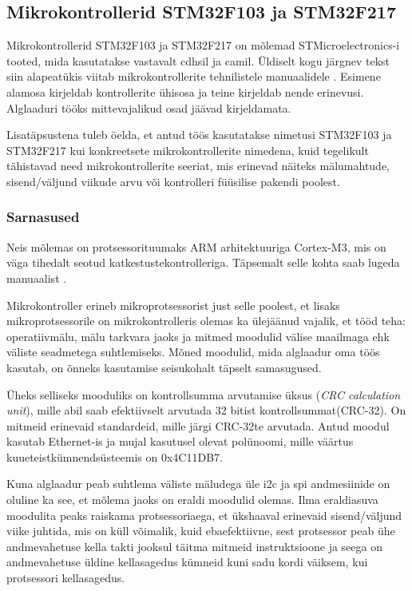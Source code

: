 \documentclass[12pt,a4paper]{article}
\begin{document}
\subsection{Mikrokontrollerid STM32F103 ja STM32F217}
\label{sec:mcu}
Mikrokontrollerid STM32F103 ja STM32F217 on mõlemad STMicroelectronics-i tooted,
mida kasutatakse vastavalt \gls{cdhs}il ja \gls{cam}il. Üldiselt kogu järgnev tekst siin
alapeatükis viitab mikrokontrollerite tehnilistele manuaalidele
\cite{f1rm,f2rm}. Esimene alamosa kirjeldab kontrollerite ühisosa ja teine
kirjeldab nende erinevusi. Alglaaduri tööks mittevajalikud osad jäävad
kirjeldamata.

Lisatäpsustena tuleb öelda, et antud töös kasutatakse nimetusi STM32F103 ja
STM32F217 kui konkreetsete mikrokontrollerite nimedena, kuid tegelikult
tähistavad need mikrokontrollerite seeriat, mis erinevad näiteks mälumahtude,
sisend/väljund viikude arvu või kontrolleri füüsilise pakendi poolest.

\subsubsection{Sarnasused}
\label{sec:mcu:same}
Neis mõlemas on protsessorituumaks ARM arhitektuuriga Cortex-M3, mis on väga
tihedalt seotud katkestustekontrolleriga. Täpsemalt selle kohta saab lugeda
manuaalist \cite{CM3pm}.

Mikrokontroller erineb mikroprotsessorist just selle poolest, et lisaks
mikroprotsessorile on mikrokontrolleris olemas ka ülejäänud vajalik, et tööd
teha: operatiivmälu, mälu tarkvara jaoks ja mitmed moodulid välise maailmaga ehk
väliste seadmetega suhtlemiseks. Mõned moodulid, mida alglaadur oma töös
kasutab, on õnneks kasutamise seisukohalt täpselt samasugused.

Üheks selliseks mooduliks on kontrollsumma arvutamise üksus (\textit{CRC
calculation unit}), mille abil saab efektiivselt arvutada 32 bitist
kontrollsummat(CRC-32). On mitmeid erinevaid standardeid, mille järgi CRC-32te
arvutada. Antud moodul kasutab Ethernet-is ja mujal kasutusel olevat polünoomi,
mille väärtus kuueteistkümnendsüsteemis on 0x4C11DB7. 

Kuna alglaadur peab suhtlema väliste mäludega üle \gls{i2c} ja \gls{spi} andmesiinide on
oluline ka see, et mõlema jaoks on eraldi moodulid olemas. Ilma eraldiasuva
moodulita peaks raiskama protsessoriaega, et ükshaaval erinevaid sisend/väljund
viike juhtida, mis on küll võimalik, kuid ebaefektiivne, sest protsessor peab
ühe andmevahetuse kella takti jooksul täitma mitmeid instruktsioone ja seega
on andmevahetuse üldine kellasagedus kümneid kuni sadu kordi väiksem, kui
protsessori kellasagedus.
\end{document}
